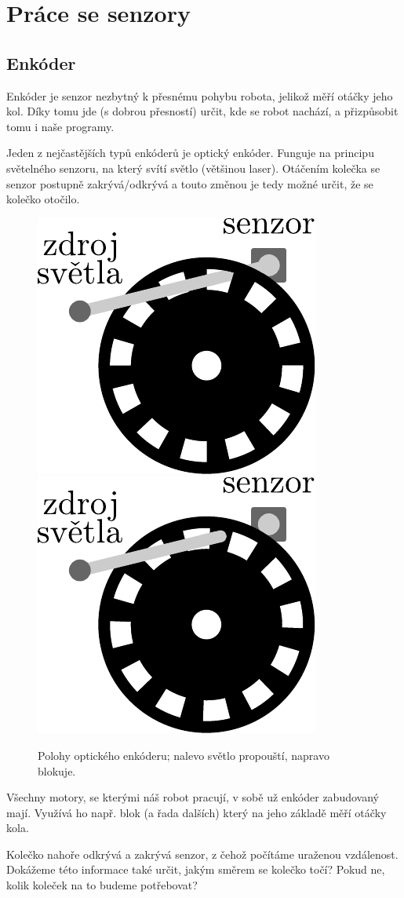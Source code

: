 \documentclass[../main.tex]{subfiles}
\begin{document}
	\section{Práce se senzory}

	\subsection{Enkóder}\label{cha:encoder}
	Enkóder je senzor nezbytný k přesnému pohybu robota, jelikož měří otáčky jeho kol. Díky tomu jde (s dobrou přesností) určit, kde se robot nachází, a přizpůsobit tomu i naše programy.

	Jeden z nejčastějších typů enkóderů je optický enkóder. Funguje na principu světelného senzoru, na který svítí světlo (většinou laser). Otáčením kolečka se senzor postupně zakrývá/odkrývá a touto změnou je tedy možné určit, že se kolečko otočilo.

	\begin{figure}
		\centering%
		\includegraphics[width=0.25\linewidth]{Images/03/encoder-through.pdf}
		\hspace{.15\textwidth}%
		\includegraphics[width=0.25\linewidth]{Images/03/encoder-blocked.pdf}
		\caption{Polohy optického enkóderu; nalevo světlo propouští, napravo blokuje.}
	\end{figure}

	Všechny motory, se kterými náš robot pracují, v sobě už enkóder zabudovaný mají. Využívá ho např. blok \blockMotorDistanceImage (a řada dalších) který na jeho základě měří otáčky kola.

	\begin{question}
		Kolečko nahoře odkrývá a zakrývá senzor, z čehož počítáme uraženou vzdálenost. Dokážeme této informace také určit, jakým směrem se kolečko točí? Pokud ne, kolik koleček na to budeme potřebovat?
	\end{question}
\end{document}
